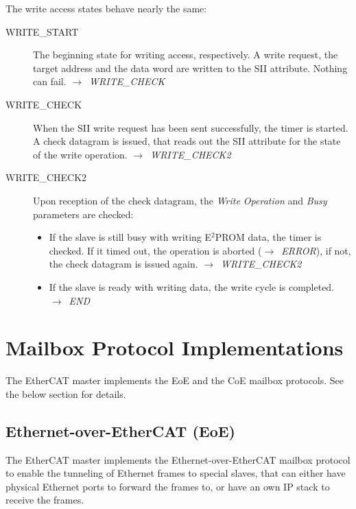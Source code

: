 \documentclass[a4paper,12pt,BCOR6mm,bibtotoc,idxtotoc]{scrbook}
\begin{document}
The write access states behave nearly the same:

\begin{description}
\item[WRITE\_START] The beginning state for writing access,
  respectively. A write request, the target address and the data word
  are written to the SII attribute. Nothing can fail.
  $\rightarrow$~\textit{WRITE\_CHECK}

\item[WRITE\_CHECK] When the SII write request has been sent
  successfully, the timer is started. A check datagram is issued, that
  reads out the SII attribute for the state of the write operation.
  $\rightarrow$~\textit{WRITE\_CHECK2}

\item[WRITE\_CHECK2] Upon reception of the check datagram, the
  \textit{Write Operation} and \textit{Busy} parameters are checked:
  \begin{itemize}
  \item If the slave is still busy with writing E$^2$PROM data, the
    timer is checked. If it timed out, the operation is aborted
    ($\rightarrow$~\textit{ERROR}), if not, the check datagram is
    issued again. $\rightarrow$~\textit{WRITE\_CHECK2}
  \item If the slave is ready with writing data, the write cycle is
    completed. $\rightarrow$~\textit{END}
  \end{itemize}
\end{description}


\section{Mailbox Protocol Implementations}

The EtherCAT master implements the EoE and the CoE mailbox
protocols. See the below section for details.


\subsection{Ethernet-over-EtherCAT (EoE)}
\label{sec:eoeimp}

The EtherCAT master implements the Ethernet-over-EtherCAT mailbox
protocol to enable the tunneling of Ethernet frames to special slaves,
that can either have physical Ethernet ports to forward the frames to,
or have an own IP stack to receive the frames.
\end{document}
